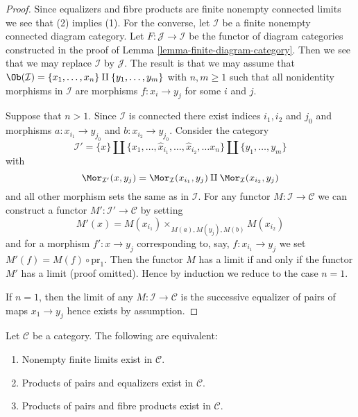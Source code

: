 \begin{proof}
Since equalizers and fibre products are finite nonempty connected
limits we see that (2) implies (1). For the converse, let $\mathcal{I}$
be a finite nonempty connected diagram category. Let
$F : \mathcal{J} \to \mathcal{I}$
be the functor of diagram categories constructed in the proof of
Lemma \ref{lemma-finite-diagram-category}.
Then we see that we may replace $\mathcal{I}$ by $\mathcal{J}$.
The result is that we may assume that
$\Ob(\mathcal{I}) = \{x_1, \ldots, x_n\} \amalg \{y_1, \ldots, y_m\}$
with $n, m \geq 1$ such that all nonidentity morphisms in $\mathcal{I}$
are morphisms $f : x_i \to y_j$ for some $i$ and $j$.

\medskip\noindent
Suppose that $n > 1$. Since $\mathcal{I}$ is connected there
exist indices $i_1, i_2$ and $j_0$ and morphisms $a : x_{i_1} \to y_{j_0}$
and $b : x_{i_2} \to y_{j_0}$. Consider the category
$$
\mathcal{I}' =
\{x\} \amalg \{x_1, \ldots, \hat x_{i_1}, \ldots, \hat x_{i_2}, \ldots x_n\}
\amalg \{y_1, \ldots, y_m\}
$$
with
$$
\Mor_{\mathcal{I}'}(x, y_j) = \Mor_\mathcal{I}(x_{i_1}, y_j)
\amalg \Mor_\mathcal{I}(x_{i_2}, y_j)
$$
and all other morphism sets the same as in $\mathcal{I}$. For any functor
$M : \mathcal{I} \to \mathcal{C}$ we can construct a functor
$M' : \mathcal{I}' \to \mathcal{C}$ by setting
$$
M'(x) = M(x_{i_1}) \times_{M(a), M(y_j), M(b)} M(x_{i_2})
$$
and for a morphism $f' : x \to y_j$ corresponding to, say,
$f : x_{i_1} \to y_j$ we set $M'(f) = M(f) \circ \text{pr}_1$.
Then the functor $M$ has a limit if and only if the functor $M'$ has
a limit (proof omitted). Hence by induction we reduce to the case $n = 1$.

\medskip\noindent
If $n = 1$, then the limit of any $M : \mathcal{I} \to \mathcal{C}$ is
the successive equalizer of pairs of maps $x_1 \to y_j$ hence
exists by assumption.
\end{proof}

\begin{lemma}
\label{lemma-almost-finite-limits-exist}
Let $\mathcal{C}$ be a category.
The following are equivalent:
\begin{enumerate}
\item Nonempty finite limits exist in $\mathcal{C}$.
\item Products of pairs and equalizers exist in $\mathcal{C}$.
\item Products of pairs and fibre products exist in $\mathcal{C}$.
\end{enumerate}
\end{lemma}

